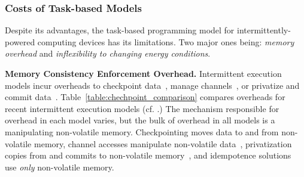 \subsubsection{Costs of Task-based Models}
\label{sec:cost_task-based}

Despite its advantages, the task-based programming model for intermittently-powered computing devices has its limitations. Two major ones being: {\em memory overhead} and {\em inflexibility to changing energy conditions}.

\textbf{Memory Consistency Enforcement Overhead.} Intermittent execution models incur overheads to checkpoint data~\cite{dino,ratchet,quickrecall,mementos}, manage channels~\cite{chain}, or privatize and commit data~\cite{alpaca}. Table~\ref{table:chechpoint_comparison} compares overheads for recent intermittent execution models (cf. \cite[Sec. 2.4]{alpaca}.) The mechanism responsible for overhead in each model varies, but the bulk of overhead in all models is a manipulating non-volatile memory. Checkpointing moves data to and from non-volatile memory, channel accesses manipulate non-volatile data~\cite{chain}, privatization copies from and commits to non-volatile memory~\cite{alpaca}, and idempotence solutions~\cite{ratchet} use {\em only} non-volatile memory.  

